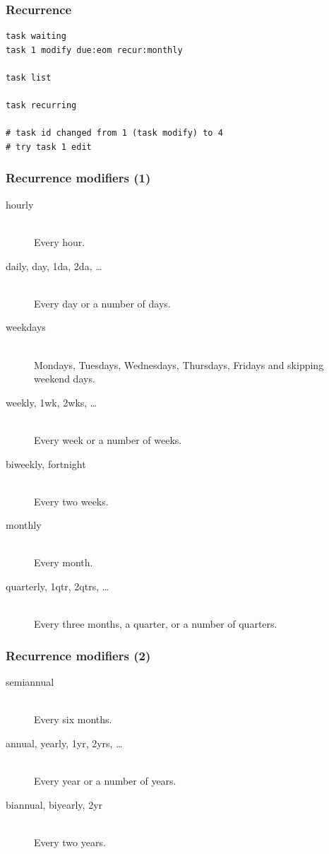 \documentclass[t]{beamer}
\begin{document}
\begin{frame}[fragile]\frametitle{Recurrence}
    \vfill
    \begin{lstlisting}
task waiting
task 1 modify due:eom recur:monthly

task list

task recurring

# task id changed from 1 (task modify) to 4
# try task 1 edit\end{lstlisting}
\end{frame}

\begin{frame}[fragile]\frametitle{Recurrence modifiers (1)}
    \begin{description}
        \item[hourly] \hfill \\
            Every hour.
        \item[daily, day, 1da, 2da, \ldots] \hfill \\
            Every day or a number of days.
        \item[weekdays] \hfill \\
            Mondays, Tuesdays, Wednesdays, Thursdays, Fridays and skipping weekend days.
        \item[weekly, 1wk, 2wks, \ldots] \hfill \\
            Every week or a number of weeks.
        \item[biweekly, fortnight] \hfill \\
            Every two weeks.
        \item[monthly] \hfill \\
            Every month.
        \item[quarterly, 1qtr, 2qtrs, \ldots] \hfill \\
            Every three months, a quarter, or a number of quarters.
    \end{description}
\end{frame}

\begin{frame}[fragile]\frametitle{Recurrence modifiers (2)}
    \begin{description}
        \item[semiannual] \hfill \\
            Every six months.
        \item[annual, yearly, 1yr, 2yrs, \ldots] \hfill \\
            Every year or a number of years.
        \item[biannual, biyearly, 2yr] \hfill \\
            Every two years.
    \end{description}
\end{frame}
\end{document}
